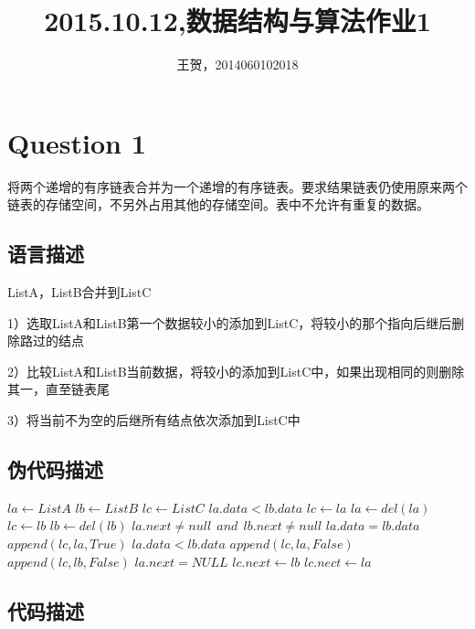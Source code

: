 \documentclass{article}
\author{王贺，2014060102018}
\title{2015.10.12,数据结构与算法作业1}
\begin{document}
	\maketitle
\section{Question 1} 

将两个递增的有序链表合并为一个递增的有序链表。要求结果链表仍使用原来两个链表的存储空间，不另外占用其他的存储空间。表中不允许有重复的数据。

\subsection{语言描述} 

ListA，ListB合并到ListC\par

1）选取ListA和ListB第一个数据较小的添加到ListC，将较小的那个指向后继后删除路过的结点\par

2）比较ListA和ListB当前数据，将较小的添加到ListC中，如果出现相同的则删除其一，直至链表尾\par

3）将当前不为空的后继所有结点依次添加到ListC中

\subsection{伪代码描述}



\begin{codebox}
\li $la \gets ListA$
\li $lb \gets ListB$
\li $lc \gets ListC$
\li \If  $la.data < lb.data$				 
\li 	\Then
\li			$lc \gets la$
\li 		$la \gets del(la)$
\li 	\Else
\li     	$lc \gets lb$
\li 		$lb \gets del(lb)$
	    \End
\li \While $la.next \neq null\ \  and\ \  lb.next \neq null $  
\li 	\Do
\li	 	\If $ la.data = lb.data $  
\li 		\Then 
\li 			$ append(lc, la, True) $
\li 		\Else
\li 			\If $ la.data < lb.data $
\li					\Then
\li 					$ append(lc, la, False) $
\li 				\Else
\li 					 $ append(lc, lb, False) $
	 			\End
	  	\End
	 	\End
\li  	\If $ la.next = NULL $
\li 		\Then 
\li  			$ lc.next \gets lb $
\li 		\Else
\li			$ lc.nect \gets la $
	 	\End
		

\end{codebox}



\subsection{代码描述}
\end{document}
